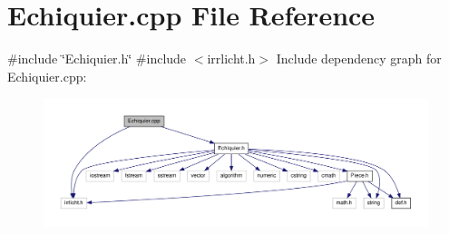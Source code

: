 \section{\-Echiquier.\-cpp \-File \-Reference}
\label{_echiquier_8cpp}
{\ttfamily \#include \char`\"{}\-Echiquier.\-h\char`\"{}}\*
{\ttfamily \#include $<$irrlicht.\-h$>$}\*
\-Include dependency graph for \-Echiquier.\-cpp\-:
\nopagebreak
\begin{figure}[H]
\begin{center}
\leavevmode
\includegraphics[width=350pt]{_echiquier_8cpp__incl}
\end{center}
\end{figure}
